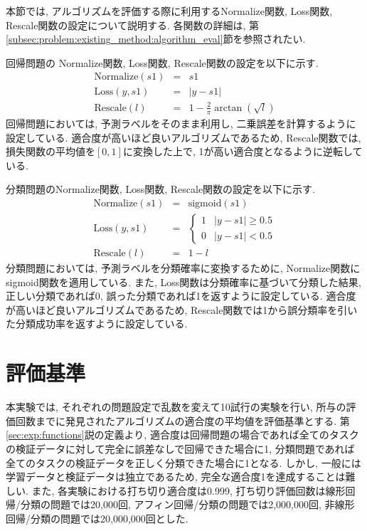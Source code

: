 \documentclass[11pt,oneside,openany,report]{jsbook}
\begin{document}
本節では, アルゴリズムを評価する際に利用するNormalize関数, Loss関数, Rescale関数の設定について説明する. 各関数の詳細は, 第\ref{subsec:problem:existing_method:algorithm_eval}節を参照されたい.

回帰問題の Normalize関数, Loss関数, Rescale関数の設定を以下に示す.
\begin{eqnarray*}
\mathrm{Normalize}(s1) &=& s1 \\
\mathrm{Loss}(y, s1) &=& \left|y - s1\right| \\
\mathrm{Rescale}(l) &=& 1 - \frac{2}{\pi} \arctan\left(\sqrt{l}\right)
\end{eqnarray*}
\noindent
回帰問題においては, 予測ラベルをそのまま利用し, 二乗誤差を計算するように設定している. 適合度が高いほど良いアルゴリズムであるため, Rescale関数では, 損失関数の平均値を$[0,1]$に変換した上で, 1が高い適合度となるように逆転している.

分類問題のNormalize関数, Loss関数, Rescale関数の設定を以下に示す.
\begin{eqnarray*}
\mathrm{Normalize}(s1) &=& \mathrm{sigmoid}(s1) \\
\mathrm{Loss}(y, s1) &=&
\begin{cases}
  1 & |y-s1| \geq 0.5 \\
  0 & |y-s1| < 0.5
\end{cases} \\
\mathrm{Rescale}(l) &=& 1 - l
\end{eqnarray*}
\noindent
分類問題においては, 予測ラベルを分類確率に変換するために, Normalize関数にsigmoid関数を適用している. また, Loss関数は分類確率に基づいて分類した結果, 正しい分類であれば0, 誤った分類であれば1を返すように設定している. 適合度が高いほど良いアルゴリズムであるため, Rescale関数では1から誤分類率を引いた分類成功率を返すように設定している.

\section{評価基準}\label{sec:proposed:exp:eval}

本実験では, それぞれの問題設定で乱数を変えて10試行の実験を行い, 所与の評価回数までに発見されたアルゴリズムの適合度の平均値を評価基準とする. 第\ref{sec:exp:functions}説の定義より, 適合度は回帰問題の場合であれば全てのタスクの検証データに対して完全に誤差なしで回帰できた場合に1, 分類問題であれば全てのタスクの検証データを正しく分類できた場合に1となる. しかし, 一般には学習データと検証データは独立であるため, 完全な適合度1を達成することは難しい. また, 各実験における打ち切り適合度は0.999, 打ち切り評価回数は線形回帰/分類の問題では20,000回, アフィン回帰/分類の問題では2,000,000回, 非線形回帰/分類の問題では20,000,000回とした.
\end{document}
